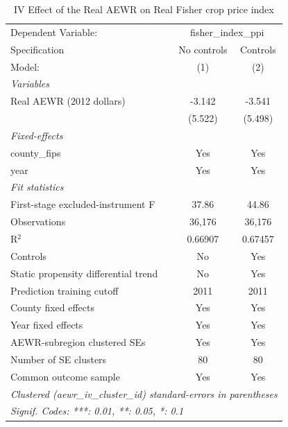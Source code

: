 
\begin{table}[htbp]
   \caption{\label{tab:iv_prices} IV Effect of the Real AEWR on Real Fisher crop price index}
   \centering
   \begin{tabular}{lcc}
      \tabularnewline \midrule \midrule
      Dependent Variable: & \multicolumn{2}{c}{fisher\_index\_ppi}\\
      Specification                        & No controls & Controls \\
      Model:                               & (1)         & (2)\\
      \midrule
      \emph{Variables}\\
      Real AEWR (2012 dollars)             & -3.142      & -3.541\\
                                           & (5.522)     & (5.498)\\
      \midrule
      \emph{Fixed-effects}\\
      county\_fips                         & Yes         & Yes\\
      year                                 & Yes         & Yes\\
      \midrule
      \emph{Fit statistics}\\
      First-stage excluded-instrument F    & 37.86       & 44.86\\
      Observations                         & 36,176      & 36,176\\
      R$^2$                                & 0.66907     & 0.67457\\
      Controls                             & No          & Yes\\
      Static propensity differential trend & No          & Yes\\
      Prediction training cutoff           & 2011        & 2011\\
      County fixed effects                 & Yes         & Yes\\
      Year fixed effects                   & Yes         & Yes\\
      AEWR-subregion clustered SEs         & Yes         & Yes\\
      Number of SE clusters                & 80          & 80\\
      Common outcome sample                & Yes         & Yes\\
      \midrule \midrule
      \multicolumn{3}{l}{\emph{Clustered (aewr\_iv\_cluster\_id) standard-errors in parentheses}}\\
      \multicolumn{3}{l}{\emph{Signif. Codes: ***: 0.01, **: 0.05, *: 0.1}}\\
   \end{tabular}


\end{table}
